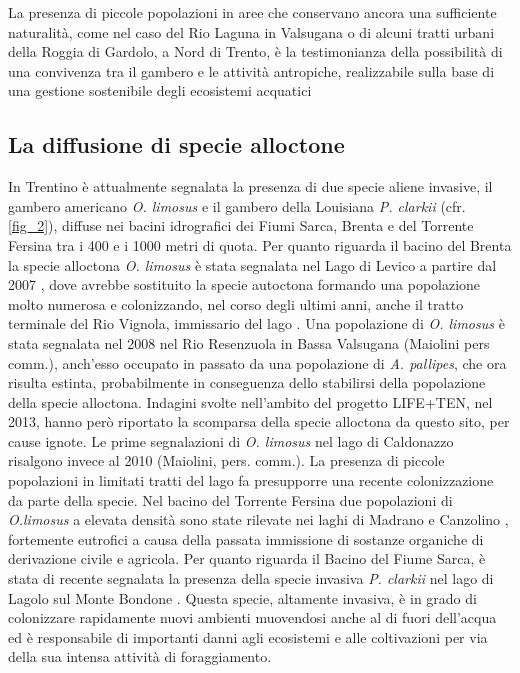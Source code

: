 \documentclass[11pt,a4paper,italian,twoside,openany]{memoir}
\begin{document}
La presenza di piccole popolazioni in aree che conservano ancora una sufficiente naturalità, come nel caso del Rio Laguna in Valsugana o di alcuni tratti urbani della Roggia di Gardolo, a Nord di Trento, è la testimonianza della possibilità di una convivenza tra il gambero e le attività antropiche, realizzabile sulla base di una gestione sostenibile degli ecosistemi acquatici

\subsection{La diffusione di specie alloctone}
\label{subs_alloct}
In Trentino è attualmente segnalata la presenza di due specie aliene invasive, il gambero americano \emph{O. limosus} e il gambero della Louisiana \emph{P. clarkii} (cfr. \ref{fig_2}), diffuse nei bacini idrografici dei Fiumi Sarca, Brenta e del Torrente Fersina tra i 400 e i 1000 metri di quota. Per quanto riguarda il bacino del Brenta la specie alloctona \emph{O. limosus} è stata segnalata nel Lago di Levico a partire dal 2007 \cite{Paoli 2008}, dove avrebbe sostituito la specie autoctona formando una popolazione molto numerosa e colonizzando, nel corso degli ultimi anni, anche il tratto terminale del Rio Vignola, immissario del lago \cite{Ciutti 2013}. Una popolazione di \emph{O. limosus} è stata segnalata nel 2008 nel Rio Resenzuola in Bassa Valsugana (Maiolini pers comm.), anch'esso occupato in passato da una popolazione di \emph{A. pallipes}, che ora risulta estinta, probabilmente in conseguenza dello stabilirsi della popolazione della specie alloctona. Indagini svolte nell'ambito del progetto LIFE+TEN, nel 2013, hanno però riportato la scomparsa della specie alloctona da questo sito, per cause ignote. Le prime segnalazioni di \emph{O. limosus} nel lago di Caldonazzo risalgono invece al 2010 (Maiolini, pers. comm.). La presenza di piccole popolazioni in limitati tratti del lago fa presupporre una recente colonizzazione da parte della specie. Nel bacino del Torrente Fersina due popolazioni di \emph{O.limosus} a elevata densità sono state rilevate nei laghi di Madrano e Canzolino \cite{Endrizzi 2013}, fortemente eutrofici a causa della passata immissione di sostanze organiche di derivazione civile e agricola. Per quanto riguarda il Bacino del Fiume Sarca, è stata di recente segnalata la presenza della specie invasiva \emph{P. clarkii} nel lago di Lagolo sul Monte Bondone \cite{Cappelletti 2014}. Questa specie, altamente invasiva, è in grado di colonizzare rapidamente nuovi ambienti muovendosi anche al di fuori dell'acqua ed è responsabile di importanti danni agli ecosistemi e alle coltivazioni per via della sua intensa attività di foraggiamento.
\end{document}
